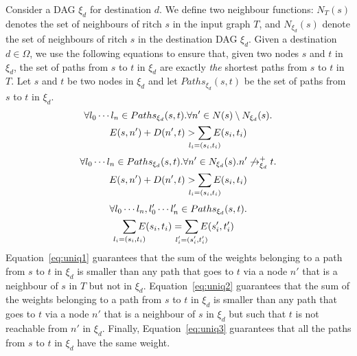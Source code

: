 Consider a DAG $\xi_d$ for destination $d$. We define two neighbour
functions: $N_T(s)$ denotes the set of neighbours of ritch $s$ 
in the input graph $T$, and $N_{\xi_d}(s)$ denote the set of
neighbours of ritch $s$ in the destination DAG $\xi_d$. 
Given a destination $d\in \Omega$,
we use the following equations to ensure that, given two nodes $s$ and $t$ in
$\xi_d$, 
the set of paths from $s$ to $t$ in $\xi_d$ are
exactly
\emph{the} shortest paths from $s$ to $t$ in $T$.
Let $s$ and $t$ be two nodes in $\xi_d$ and let  $Paths_{\xi_d}(s,t)$ be the set of paths from $s$ to $t$ in $\xi_d$.
\begin{multline} \label{eq:uniq1}
		\forall l_0\cdots l_n\in Paths_{\xi_d}(s,t).
		\forall n' \in N(s) \setminus N_{\xi_d}(s). \\
		E(s, n') + D(n', t) > \sum_{\mathclap{\substack{l_i=(s_i,t_i)}}} 
		E(s_i, t_i) 
\end{multline}
\begin{multline} \label{eq:uniq2}
		\forall l_0\cdots l_n\in Paths_{\xi_d}(s,t).
		\forall n' \in N_{\xi_d}(s). n' \not\rightarrow^+_{\xi_d} t.  \\
		E(s, n') + D(n', t) > \sum_{\mathclap{\substack{l_i=(s_i,t_i)}}} 
		E(s_i, t_i) 
\end{multline}
\vspace{-2mm}
\begin{multline} \label{eq:uniq3}
		\forall l_0\cdots l_n, l_0'\cdots l_n'\in Paths_{\xi_d}(s,t).\\
		\sum_{\mathclap{\substack{l_i=(s_i,t_i)}}} 
		E(s_i, t_i)  =\sum_{\mathclap{\substack{l_i'=(s_i',t_i')}}} 
		E(s_i', t_i') 
\end{multline}
Equation~\ref{eq:uniq1} guarantees that 
the sum of the weights belonging to a path from $s$ to $t$ in $\xi_d$ is smaller than 
any path that goes to $t$ via a node $n'$ that is a neighbour of $s$ in $T$ but not in $\xi_d$.
Equation~\ref{eq:uniq2} guarantees that
the sum of the weights belonging to a path from $s$ to $t$ in $\xi_d$ is smaller than 
any path that goes to $t$ via a node $n'$ that is a neighbour of $s$ in $\xi_d$ but such that
$t$ is not reachable from $n'$ in $\xi_d$.
Finally, Equation~\ref{eq:uniq3} guarantees that all the paths from $s$ to $t$ in $\xi_d$ have the same weight.
